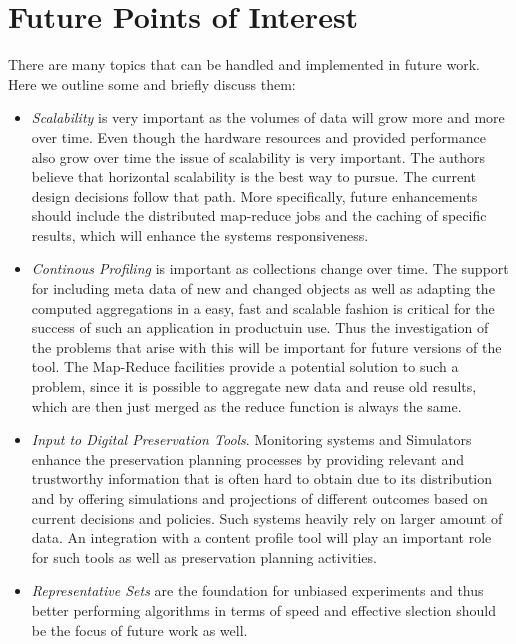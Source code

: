 \section{Future Points of Interest}
There are many topics that can be handled and implemented in future work. Here we outline some and briefly discuss them:
\begin {itemize}
\item \textit{Scalability} is very important as the volumes of data will grow more and more over time. Even though the hardware resources and provided performance also grow over time the issue of scalability is very important. The authors believe that horizontal scalability is the best way to pursue. The current design decisions follow that path. More specifically, future enhancements should include the distributed map-reduce jobs and the caching of specific results, which will enhance the systems responsiveness.
\item \textit{Continous Profiling} is important as collections change over time. The support for including meta data of new and changed objects as well as adapting the computed aggregations in a easy, fast and scalable fashion is critical for the success of such an application in productuin use. Thus the investigation of the problems that arise with this will be important for future versions of the tool. The Map-Reduce facilities provide a potential solution to such a problem, since it is possible to aggregate new data and reuse old results, which are then just merged as the reduce function is always the same. 
\item \textit{Input to Digital Preservation Tools}. Monitoring systems and Simulators enhance the preservation planning processes by providing relevant and trustworthy information that is often hard to obtain due to its distribution and by offering simulations and projections of different outcomes based on current decisions and policies. Such systems heavily rely on larger amount of data. An integration with a content profile tool will play an important role for such tools as well as preservation planning activities.
\item \textit{Representative Sets} are the foundation for unbiased experiments and thus better performing algorithms in terms of speed and effective slection should be the focus of future work as well. 
\end{itemize}

